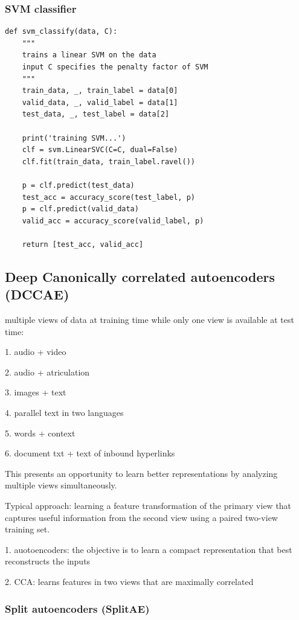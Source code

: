 \documentclass[a4paper]{article}
\begin{document}
\subsubsection{SVM classifier}
\begin{verbatim}
def svm_classify(data, C):
    """
    trains a linear SVM on the data
    input C specifies the penalty factor of SVM
    """
    train_data, _, train_label = data[0]
    valid_data, _, valid_label = data[1]
    test_data, _, test_label = data[2]

    print('training SVM...')
    clf = svm.LinearSVC(C=C, dual=False)
    clf.fit(train_data, train_label.ravel())

    p = clf.predict(test_data)
    test_acc = accuracy_score(test_label, p)
    p = clf.predict(valid_data)
    valid_acc = accuracy_score(valid_label, p)

    return [test_acc, valid_acc]
\end{verbatim}

\subsection{Deep Canonically correlated autoencoders (DCCAE)}

multiple views of data at training time while only one view is available at test time:

1. audio + video

2. audio + atriculation

3. images + text

4. parallel text in two languages

5. words + context

6. document txt + text of inbound hyperlinks

This presents an opportunity to learn better representations by analyzing multiple views simultaneously.

Typical approach: learning a feature transformation of the primary view that captures useful information from the second view using a paired two-view training set.

1. auotoencoders: the objective is to learn a compact representation that best reconstructs the inputs

2. CCA: learns features in two views that are maximally correlated

\subsubsection{Split autoencoders (SplitAE)}
\end{document}
